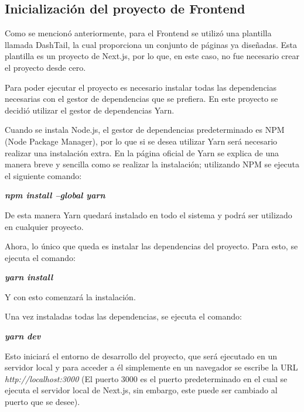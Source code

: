 \subsection{Inicialización del proyecto de Frontend}
Como se mencionó anteriormente, para el Frontend se utilizó una plantilla llamada DashTail, la cual proporciona un conjunto de páginas ya diseñadas. Esta plantilla es un proyecto de Next.js, por lo que, en este caso, no fue necesario crear el proyecto desde cero.

Para poder ejecutar el proyecto es necesario instalar todas las dependencias necesarias con el gestor de dependencias que se prefiera. En este proyecto se decidió utilizar el gestor de dependencias Yarn.

Cuando se instala Node.js, el gestor de dependencias predeterminado es NPM (Node Package Manager), por lo que si se desea utilizar Yarn será necesario realizar una instalación extra. En la página oficial de Yarn se explica de una manera breve y sencilla como se realizar la instalación; utilizando NPM se ejecuta el siguiente comando:
    \begin{center}
        \textbf{
            \emph{
                npm install --global yarn
                }
            }
    \end{center}
De esta manera Yarn quedará instalado en todo el sistema y podrá ser utilizado en cualquier proyecto.

Ahora, lo único que queda es instalar las dependencias del proyecto. Para esto, se ejecuta el comando: 
    \begin{center}
        \textbf{
            \emph{
                yarn install
                }
            }
    \end{center}
Y con esto comenzará la instalación.

Una vez instaladas todas las dependencias, se ejecuta el comando:
    \begin{center}
        \textbf{
            \emph{
                yarn dev
                }
            }
    \end{center}
Esto iniciará el entorno de desarrollo del proyecto, que será ejecutado en un servidor local y para acceder a él simplemente en un navegador se escribe la URL \emph{http://localhost:3000} (El puerto 3000 es el puerto predeterminado en el cual se ejecuta el servidor local de Next.js, sin embargo, este puede ser cambiado al puerto que se desee).